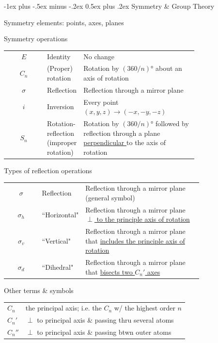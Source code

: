 \documentclass[10pt,landscape]{article}
\makeatletter
\renewcommand{\section}{\@startsection{section}{1}{0mm}%
                                {-1ex plus -.5ex minus -.2ex}%
                                {0.5ex plus .2ex}%
                                {\normalfont\large\bfseries}}
\newcommand{\halfline}{\vspace{0.5em}}
\newcommand{\tableindent}{\hspace{1.5em}}
\makeatother
\begin{document}
\begin{multicols}{3}
\hrulefill

\section{Symmetry \& Group Theory}

Symmetry elements: points, axes, planes
\halfline

Symmetry operations
%
\renewcommand{\arraystretch}{1.4}
\begin{tabular}{@{\tableindent}cp{0.18\linewidth}<{\raggedright}p{0.6\linewidth}<{\raggedright}@{}}
	$E$ & Identity & No change \\
	$C_n$ & (Proper) rotation  & Rotation by $(360/n)$° about an axis of rotation \\
	$\sigma$ & Reflection  & Reflection through a mirror plane \\
	$i$ & Inversion  & Every point $(x, y, z) \rightarrow (-x, -y, -z)$ \\ %
	$S_n$ & Rotation-reflection (improper rotation)  & Rotation by $(360/n)$° followed by reflection through a plane \underline{perpendicular }to the axis of rotation
\end{tabular}
\renewcommand{\arraystretch}{1}

Types of reflection operations
%
\renewcommand{\arraystretch}{1.4}
\begin{tabular}{@{\tableindent}cp{0.2\linewidth}<{\raggedright}p{0.6\linewidth}<{\raggedright}@{}}
	$\sigma$ & Reflection & Reflection through a mirror plane (general symbol) \\
	$\sigma_h$ & ``Horizontal"  & Reflection through a mirror plane \underline{$\perp$ to the principle axis of rotation} \\
	$\sigma_v$ & ``Vertical" & Reflection through a mirror plane that \underline{includes the principle axis of} \underline{rotation} \\
	$\sigma_d$ & ``Dihedral" & Reflection through a mirror plane that \underline{bisects two $C_n'$ axes} \\
\end{tabular}
\renewcommand{\arraystretch}{1}

Other terms \& symbols
\renewcommand{\arraystretch}{1.4}
\begin{tabular}{@{\tableindent}lp{0,8\linewidth}@{}}
	$C_n$ & the principal axis; i.e. the $C_n$ w/ the highest order $n$ \\
	$C_n'$ & $\perp$ to principal axis \& passing thru several atoms \\
	$C_n''$ & $\perp$ to principal axis \& passing btwn outer atoms \\
\end{tabular}
\renewcommand{\arraystretch}{1}


\end{multicols}
\end{document}
